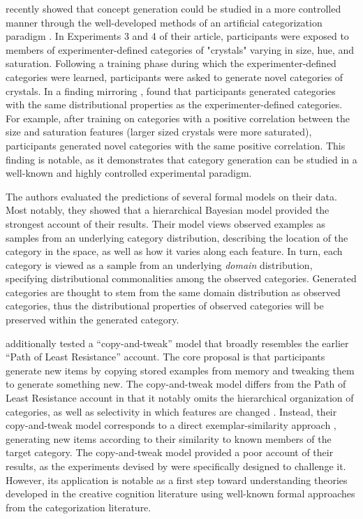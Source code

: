 \documentclass[12pt]{article}
\begin{document}
\begin{flushleft}
\cite{jern2013probabilistic} recently showed that concept generation could be
studied in a more controlled manner through the well-developed methods of an
artificial categorization paradigm \citep[see][for a review]{kurtz2015human}. In
Experiments 3 and 4 of their article, participants were exposed to members of
experimenter-defined categories of "crystals" varying in size, hue, and
saturation. Following a training phase during which the experimenter-defined
categories were learned, participants were asked to generate novel categories of
crystals. In a finding mirroring \cite{ward1994structured},
\cite{jern2013probabilistic} found that participants generated categories with
the same distributional properties as the experimenter-defined categories. For
example, after training on categories with a positive correlation between the
size and saturation features (larger sized crystals were more saturated),
participants generated novel categories with the same positive correlation. This
finding is notable, as it demonstrates that category generation can be studied
in a well-known and highly controlled experimental paradigm.

The authors evaluated the predictions of several formal models on their data.
Most notably, they showed that a hierarchical Bayesian model provided the
strongest account of their results. Their model views observed examples as
samples from an underlying category distribution, describing the location of the
category in the space, as well as how it varies along each feature. In turn,
each category is viewed as a sample from an underlying {\em domain}
distribution, specifying distributional commonalities among the observed
categories. Generated categories are thought to stem from the same domain
distribution as observed categories, thus the distributional properties of
observed categories will be preserved within the generated category. 

\cite{jern2013probabilistic} additionally tested a ``copy-and-tweak'' model that
broadly resembles the earlier ``Path of Least Resistance'' account. The core
proposal is that participants generate new items by copying stored examples from
memory and tweaking them to generate something new. The copy-and-tweak model
differs from the Path of Least Resistance account in that it notably omits the
hierarchical organization of categories, as well as selectivity in which
features are changed \citep[both of which are factors in the Path of Least
Resistance account;][]{ward2002role}. Instead, their copy-and-tweak model
corresponds to a direct exemplar-similarity approach
\citep[e.g.,][]{nosofsky1984choice,nosofsky1986attention}, generating new items
according to their similarity to known members of the target category. The
copy-and-tweak model provided a poor account of their results, as the
experiments devised by \citeauthor{jern2013probabilistic} were specifically
designed to challenge it. However, its application is notable as a first step
toward understanding theories developed in the creative cognition literature
using well-known formal approaches from the categorization literature.


\end{flushleft}
\end{document}
